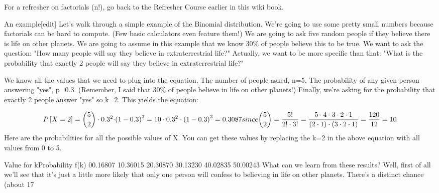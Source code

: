 

For a refresher on factorials (n!), go back to the Refresher Course earlier in this wiki book.

An example[edit]
Let's walk through a simple example of the Binomial distribution. We're going to use some pretty small numbers because factorials can be hard to compute. (Few basic calculators even feature them!) We are going to ask five random people if they believe there is life on other planets. We are going to assume in this example that we know 30\% of people believe this to be true. We want to ask the question: "How many people will say they believe in extraterrestrial life?" Actually, we want to be more specific than that: "What is the probability that exactly 2 people will say they believe in extraterrestrial life?"



We know all the values that we need to plug into the equation. The number of people asked, n=5. The probability of any given person answering "yes", p=0.3. (Remember, I said that 30\% of people believe in life on other planets!) Finally, we're asking for the probability that exactly 2 people answer "yes" so k=2. This yields the equation:

\[P \left[X = 2 \right] = {5 \choose 2} \cdot {{0.3^2 \cdot} {\left( 1 - 0.3 \right)^{3}}} = {10} \cdot {{0.3^2} \cdot {\left( 1-0.3 \right)^{3}}} = 0.3087 since {5 \choose 2}={5! \over 2! \cdot 3!}={5 \cdot 4 \cdot 3 \cdot 2 \cdot 1 \over (2 \cdot 1) \cdot (3 \cdot 2 \cdot 1)}={120 \over 12}=10\]
Here are the probabilities for all the possible values of X. You can get these values by replacing the k=2 in the above equation with all values from 0 to 5.



Value for kProbability f(k)
00.16807
10.36015
20.30870
30.13230
40.02835
50.00243
What can we learn from these results? Well, first of all we'll see that it's just a little more likely that only one person will confess to believing in life on other planets. There's a distinct chance (about 17%


